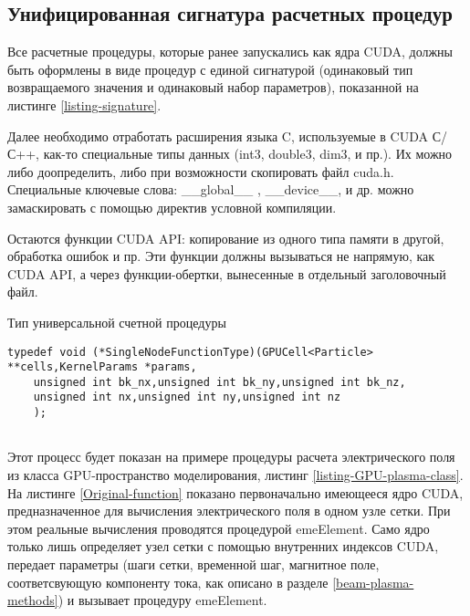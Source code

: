 \subsection{Унифицированная сигнатура расчетных процедур}
Все расчетные процедуры, которые ранее запускались как ядра CUDA, должны быть оформлены в виде процедур с единой сигнатурой (одинаковый тип возвращаемого значения и одинаковый набор параметров), показанной на листинге \ref{listing-signature}.

Далее необходимо отработать расширения языка C, используемые в CUDA С/С++, как-то специальные типы данных
(int3, double3, dim3, и пр.). Их можно либо доопределить, либо при возможности скопировать файл cuda.h. Специальные ключевые слова: \_\_global\_\_ ,         \_\_device\_\_, и др. можно 
замаскировать с помощью директив условной компиляции.

Остаются функции CUDA API: копирование из одного типа памяти в другой, обработка ошибок и пр. Эти функции должны вызываться не напрямую, как CUDA API, а через функции-обертки, вынесенные в отдельный заголовочный файл.

\begin{ListingEnv}[!h]
	\captiondelim{ } %
\caption{Тип универсальной счетной процедуры}
\label{listing-signature}
	\begin{lstlisting}[language={[ISO]C++}]
	typedef void (*SingleNodeFunctionType)(GPUCell<Particle>  **cells,KernelParams *params,
	unsigned int bk_nx,unsigned int bk_ny,unsigned int bk_nz,
	unsigned int nx,unsigned int ny,unsigned int nz
	);
	
	\end{lstlisting}
\end{ListingEnv}

Этот процесс будет показан на примере процедуры расчета электрического поля из класса GPU-пространство моделирования, листинг \ref{listing-GPU-plasma-class}. На листинге \ref{Original-function} показано первоначально имеющееся ядро CUDA, предназначенное для вычисления электрического поля в одном узле сетки. При этом реальные вычисления проводятся процедурой emeElement. Само ядро только лишь определяет узел сетки с помощью внутренних индексов CUDA, передает параметры (шаги сетки, временной шаг, магнитное поле, соответсвующую компоненту тока, как описано в разделе \ref{beam-plasma-methods}) и вызывает процедуру emeElement.


